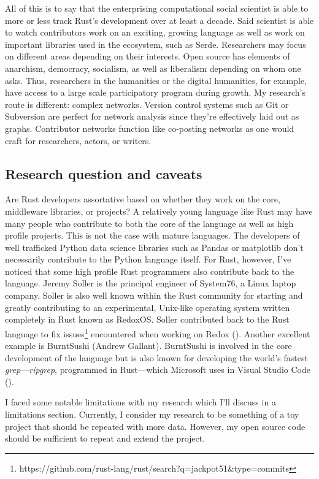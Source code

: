 \documentclass[12pt, a4paper]{article}
\begin{document}
All of this is to say that the enterprising computational social scientist is able to more or less track Rust's development over at least a decade. Said scientist is able to watch contributors work on an exciting, growing language as well as work on important libraries used in the ecosystem, such as Serde. Researchers may focus on different areas depending on their interests. Open source has elements of anarchism, democracy, socialism, as well as liberalism depending on whom one asks. Thus, researchers in the humanities or the digital humanities, for example, have access to a large scale participatory program during growth. My research's route is different: complex networks. Version control systems such as Git or Subversion are perfect for network analysis since they're effectively laid out as graphs. Contributor networks function like co-posting networks as one would craft for researchers, actors, or writers.

\subsection{Research question and caveats}
Are Rust developers assortative based on whether they work on the core, middleware libraries, or projects? A relatively young language like Rust may have many people who contribute to both the core of the language as well as high profile projects. This is not the case with mature languages. The developers of well trafficked Python data science libraries such as Pandas or matplotlib don't necessarily contribute to the Python language itself. For Rust, however, I've noticed that some high profile Rust programmers also contribute back to the language. Jeremy Soller is the principal engineer of System76, a Linux laptop company. Soller is also well known within the Rust community for starting and greatly contributing to an experimental, Unix-like operating system written completely in Rust known as RedoxOS. Soller contributed back to the Rust language to fix issues\footnote{https://github.com/rust-lang/rust/search?q=jackpot51\&type=commits} encountered when working on Redox (\cite{lunduke31317}). Another excellent example is BurntSushi (Andrew Gallant). BurntSushi is involved in the core development of the language but is also known for developing the world's fastest \textit{grep}---\textit{ripgrep}, programmed in Rust---which Microsoft uses in Visual Studio Code (\cite{gallant2016}).

I faced some notable limitations with my research which I'll discuss in a limitations section. Currently, I consider my research to be something of a toy project that should be repeated with more data. However, my open source code should be sufficient to repeat and extend the project.
\end{document}
